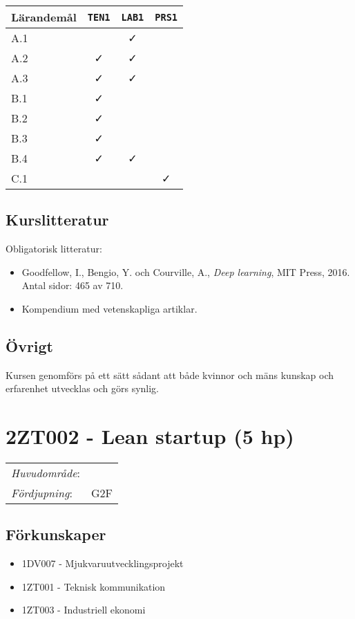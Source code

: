 \begin{longtable}[]{@{}lccc@{}}
\toprule
\textsf{Lärandemål} & \texttt{TEN1} & \texttt{LAB1} & \texttt{PRS1}\tabularnewline
\midrule
\endhead
A.1 & & \faCheck &\tabularnewline
A.2 & \faCheck & \faCheck &\tabularnewline
A.3 & \faCheck & \faCheck &\tabularnewline
B.1 & \faCheck & &\tabularnewline
B.2 & \faCheck & &\tabularnewline
B.3 & \faCheck & &\tabularnewline
B.4 & \faCheck & \faCheck &\tabularnewline
C.1 & & & \faCheck\tabularnewline
\bottomrule
\end{longtable}

\subsection*{Kurslitteratur}

Obligatorisk litteratur:

\begin{itemize}
\tightlist
\item
  Goodfellow, I., Bengio, Y. och Courville, A., \emph{Deep learning},
  MIT Press, 2016. Antal sidor: 465 av 710.
\item
  Kompendium med vetenskapliga artiklar.
\end{itemize}

\subsection*{Övrigt}

Kursen genomförs på ett sätt sådant att både kvinnor och mäns kunskap och erfarenhet utvecklas och görs synlig.
\pagebreak
\section*{2ZT002 - Lean startup (5 hp)}

\begin{tabular}{ll}
\emph{Huvudområde}: &\tabularnewline
\emph{Fördjupning}: & G2F\tabularnewline
\end{tabular}

\subsection*{Förkunskaper}

\begin{itemize}
\tightlist
\item
  1DV007 - Mjukvaruutvecklingsprojekt
\item
  1ZT001 - Teknisk kommunikation
\item
  1ZT003 - Industriell ekonomi
\end{itemize}


